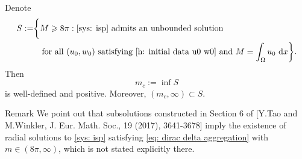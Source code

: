 \begin{frame}

\begin{corollary}
	Denote
	\begin{equation}
	\begin{split}
	S:= &\biggl\{ M \geqslant 8\pi :
        \eqref{sys: isp} \text{ admits an unbounded solution }\\
    &\quad\text{for all } (u_0, w_0) \text{ satisfying } \eqref{h: initial data u0 w0} \text{ and } M=\int_\Omega u_0\ \mathrm d{x}\biggr\}.
	\end{split}
	\end{equation}
	Then
	\[m_c := \inf S\]
is well-defined and positive. Moreover, $(m_c,\infty)\subset S$.
\end{corollary}

\begin{block}{Remark}
  We point out that subsolutions  constructed in Section 6 of [Y.Tao and M.Winkler, J. Eur. Math. Soc., 19 (2017), 3641-3678] imply the existence of radial solutions to \eqref{sys: isp} satisfying \eqref{eq: dirac delta aggregation} with $m\in(8\pi,\infty)$, which is not stated explicitly there.
\end{block}

\end{frame}



